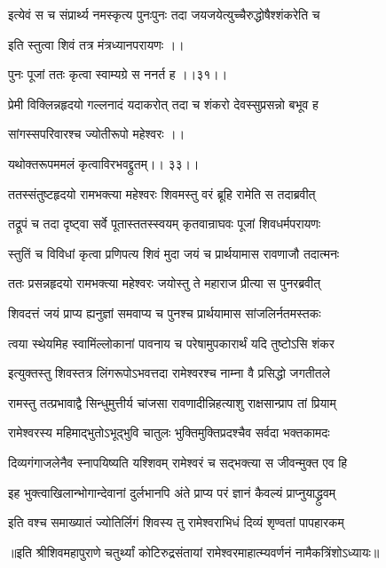 \twolineshloka
{इत्येवं स च संप्रार्थ्य नमस्कृत्य पुनःपुनः} 
{तदा जयजयेत्युच्चैरुद्धोषैश्शंकरेति च} %

इति स्तुत्वा शिवं तत्र मंत्रध्यानपरायणः ।।

पुनः पूजां ततः कृत्वा स्वाम्यग्रे स ननर्त ह ।।३१।।

\twolineshloka
{प्रेमी विक्लिन्नहृदयो गल्लनादं यदाकरोत्} 
{तदा च शंकरो देवस्सुप्रसन्नो बभूव ह} %

सांगस्सपरिवारश्च ज्योतीरूपो महेश्वरः ।।

यथोक्तरूपममलं कृत्वाविरभवद्द्रुतम्।। ३३।।

\twolineshloka
{ततस्संतुष्टहृदयो रामभक्त्या महेश्वरः} 
{शिवमस्तु वरं ब्रूहि रामेति स तदाब्रवीत्} %

\twolineshloka
{तद्रूपं च तदा दृष्ट्वा सर्वे पूतास्ततस्स्वयम्} 
{कृतवान्राघवः पूजां शिवधर्मपरायणः} %

\twolineshloka
{स्तुतिं च विविधां कृत्वा प्रणिपत्य शिवं मुदा} 
{जयं च प्रार्थयामास रावणाजौ तदात्मनः} %

\twolineshloka
{ततः प्रसन्नहृदयो रामभक्त्या महेश्वरः} 
{जयोस्तु ते महाराज प्रीत्या स पुनरब्रवीत्} %

\twolineshloka
{शिवदत्तं जयं प्राप्य ह्यनुज्ञां समवाप्य च} 
{पुनश्च प्रार्थयामास सांजलिर्नतमस्तकः} %


\twolineshloka
{त्वया स्थेयमिह स्वामिंल्लोकानां पावनाय च} 
{परेषामुपकारार्थं यदि तुष्टोऽसि शंकर} %


\twolineshloka
{इत्युक्तस्तु शिवस्तत्र लिंगरूपोऽभवत्तदा} 
{रामेश्वरश्च नाम्ना वै प्रसिद्धो जगतीतले} %

\twolineshloka
{रामस्तु तत्प्रभावाद्वै सिन्धुमुत्तीर्य चांजसा}
{रावणादीन्निहत्याशु राक्षसान्प्राप तां प्रियाम्} %

\twolineshloka
{रामेश्वरस्य महिमाद्भुतोऽभूद्भुवि चातुलः} 
{भुक्तिमुक्तिप्रदश्चैव सर्वदा भक्तकामदः} %

\twolineshloka
{दिव्यगंगाजलेनैव स्नापयिष्यति यश्शिवम्} 
{रामेश्वरं च सद्भक्त्या स जीवन्मुक्त एव हि} %

\twolineshloka
{इह भुक्त्वाखिलान्भोगान्देवानां दुर्लभानपि} 
{अंते प्राप्य परं ज्ञानं कैवल्यं प्राप्नुयाद्ध्रुवम्} %

\twolineshloka
{इति वश्च समाख्यातं ज्योतिर्लिगं शिवस्य तु}
{रामेश्वराभिधं दिव्यं शृण्वतां पापहारकम्} %

॥इति श्रीशिवमहापुराणे चतुर्थ्यां कोटिरुद्रसंतायां रामेश्वरमाहात्म्यवर्णनं नामैकत्रिंशोऽध्यायः॥